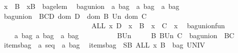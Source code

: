 \begin{isabellebody}
\ \ {\isachardoublequoteopen}x\ {\isacharbrackleft}{\isacharcolon}\ B\ {\isacharequal}{\isacharequal}\ {\isacharparenleft}x{\isacharcomma}B{\isacharparenright}\ {\isacharcolon}\ bagelem{\isachardoublequoteclose}\isanewline
\isanewline
\ \ bagunion\ {\isacharcolon}{\isacharcolon}\ {\isachardoublequoteopen}{\isacharparenleft}{\isacharprime}a\ bag\ {\isacharasterisk}\ {\isacharprime}a\ bag{\isacharparenright}\ {\isacharless}{\isacharequal}{\isachargreater}\ {\isacharprime}a\ bag{\isachardoublequoteclose}\isanewline
\ \ {\isachardoublequoteopen}bagunion\ {\isacharequal}{\isacharequal}\ {\isacharbraceleft}{\isacharparenleft}{\isacharparenleft}B{\isacharcomma}C{\isacharparenright}{\isacharcomma}D{\isacharparenright}{\isachardot}\ dom\ D\ {\isacharequal}\ dom\ B\ Un\ dom\ C\ {\isacharampersand}\isanewline
\ \ \ \ \ \ \ \ \ \ \ \ \ \ \ \ \ \ \ \ \ \ \ \ \ \ \ {\isacharparenleft}ALL\ x{\isachardot}\ D\ {\isacharbrackleft}{\isacharhash}{\isacharbrackright}\ x\ {\isacharequal}\ B\ {\isacharbrackleft}{\isacharhash}{\isacharbrackright}\ x\ {\isacharplus}\ C\ {\isacharbrackleft}{\isacharhash}{\isacharbrackright}\ x{\isacharparenright}{\isacharbraceright}{\isachardoublequoteclose}\isanewline
\isanewline
\ \ bagunion{\isacharunderscore}fun\isanewline
\ \ \ \ {\isacharcolon}{\isacharcolon}\ {\isachardoublequoteopen}{\isacharbrackleft}{\isacharprime}a\ bag{\isacharcomma}\ {\isacharprime}a\ bag{\isacharbrackright}\ {\isacharequal}{\isachargreater}\ {\isacharprime}a\ bag{\isachardoublequoteclose}\ \ \ \ \ \ \ \ \ \ {\isacharparenleft}{\isachardoublequoteopen}{\isacharparenleft}{\isacharunderscore}\ BUn{\isacharslash}\ {\isacharunderscore}{\isacharparenright}{\isachardoublequoteclose}\ \ {\isacharbrackleft}{}{}{\isacharcomma}{}{}{\isacharbrackright}{}{}{\isacharparenright}\isanewline
\ \ {\isachardoublequoteopen}B\ BUn\ C\ {\isacharequal}{\isacharequal}\ bagunion\ {\isacharpercent}{\isacharcircum}\ {\isacharparenleft}B{\isacharcomma}C{\isacharparenright}{\isachardoublequoteclose}\isanewline
\isanewline
\ \ itemsbag\ {\isacharcolon}{\isacharcolon}\ {\isachardoublequoteopen}{\isacharparenleft}{\isacharprime}a\ seq{\isacharparenright}\ {\isacharless}{\isacharequal}{\isachargreater}\ {\isacharparenleft}{\isacharprime}a\ bag{\isacharparenright}{\isachardoublequoteclose}\isanewline
\ \ {\isachardoublequoteopen}itemsbag\ {\isacharequal}{\isacharequal}\ {\isacharbraceleft}{\isacharparenleft}S{\isacharcomma}B{\isacharparenright}{\isachardot}\ ALL\ x{\isachardot}\ {\isacharparenleft}B\ {\isacharcolon}\ {\isacharparenleft}bag\ UNIV{\isacharparenright}{\isacharparenright}\ {\isacharampersand}\ \ \isanewline

\end{isabellebody}
